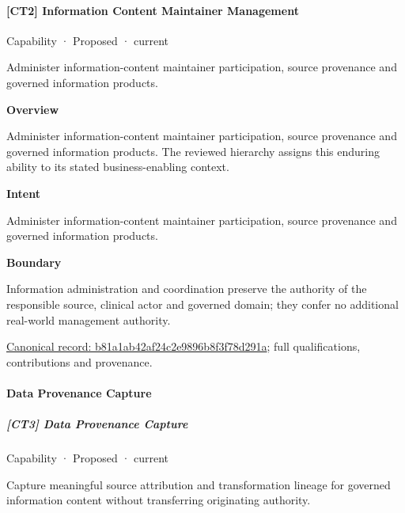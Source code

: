 \paragraph{[CT2] Information Content Maintainer Management}

\label{element:b81a1ab42af24c2e9896b8f3f78d291a}
{\small Capability · Proposed · current}\par

Administer information-content maintainer participation, source provenance and governed information products.



\textbf{Overview}



Administer information-content maintainer participation, source provenance and governed information products. The reviewed hierarchy assigns this enduring ability to its stated business-enabling context.



\textbf{Intent}



Administer information-content maintainer participation, source provenance and governed information products.



\textbf{Boundary}



Information administration and coordination preserve the authority of the responsible source, clinical actor and governed domain; they confer no additional real-world management authority.


{\footnotesize \href{../../../../continuum/strategy/capability/b81a1ab42af24c2e9896b8f3f78d291a.md}{Canonical record: b81a1ab42af24c2e9896b8f3f78d291a}; full qualifications, contributions and provenance.}\par
\paragraph{Data Provenance Capture}

\subparagraph{[CT3] Data Provenance Capture}

\label{element:44a7937520a54945b06b5fd4a2bbd870}
{\small Capability · Proposed · current}\par

Capture meaningful source attribution and transformation lineage for governed information content without transferring originating authority.



